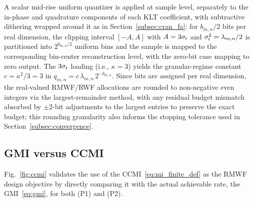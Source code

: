 \documentclass[10pt, twocolumn, comsoc]{IEEEtran}
\begin{document}
A scalar mid-rise uniform quantizer is applied at sample level, separately to the in-phase and quadrature components of each KLT coefficient, with subtractive dithering wrapped around it as in Section~\ref{subsec:cran_fa}: for $b_{m,n}/2$ bits per real dimension, the clipping interval $[-A, A]$ with $A = 3\sigma_{\sf r}$ and $\sigma_{\sf r}^2 = \lambda_{m,n}/2$ is partitioned into $2^{b_{m,n}/2}$ uniform bins and the sample is mapped to the corresponding bin-center reconstruction level, with the zero-bit case mapping to zero output. 
The $3\sigma_{\sf r}$ loading (i.e., $\kappa = 3$) yields the granular-regime constant $c = \kappa^2/3 = 3$ in $q_{m,n} = c\,\lambda_{m,n}\,2^{-b_{m,n}}$.
Since bits are assigned per real dimension, the real-valued RMWF/RWF allocations are rounded to non-negative even integers via the largest-remainder method, with any residual budget mismatch absorbed by $\pm 2$-bit adjustments to the largest entries to preserve the exact budget; this rounding granularity also informs the stopping tolerance used in Section~\ref{subsec:convergence}.



\subsection{GMI versus CCMI}\label{subsec:ccmi}





Fig.~\ref{fig:ccmi} validates the use of the CCMI~\eqref{eq:mi_finite_def} 
as the RMWF design objective by directly comparing it with the actual 
achievable rate, the GMI~\eqref{eq:gmi}, for both (P1) and (P2).
\end{document}
